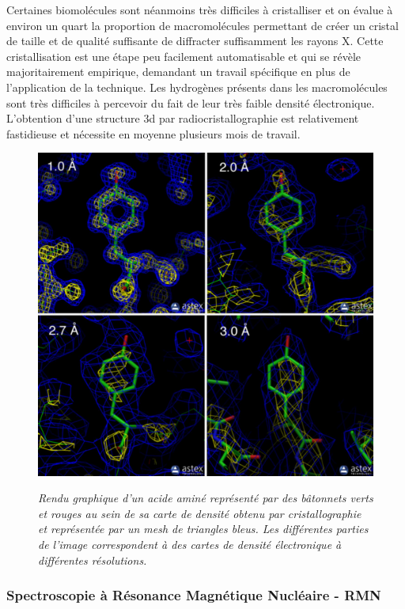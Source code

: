Certaines biomolécules sont néanmoins très difficiles à cristalliser et on évalue à environ un quart la proportion de macromolécules permettant de créer un cristal de taille et de qualité suffisante de diffracter suffisamment les rayons X. Cette cristallisation est une étape peu facilement automatisable et qui se révèle majoritairement empirique, demandant un travail spécifique en plus de l'application de la technique. Les hydrogènes présents dans les macromolécules sont très difficiles à percevoir du fait de leur très faible densité électronique. L'obtention d'une structure 3d par radiocristallographie est relativement fastidieuse et nécessite en moyenne plusieurs mois de travail.

\begin{figure}[h]
  \centering
  {\includegraphics[width=0.5\linewidth]{./figures/ch1/resolution_xray.pdf}}
    \caption{\it Rendu graphique d'un acide aminé représenté par des bâtonnets verts et rouges au sein de sa carte de densité obtenu par cristallographie et représentée par un mesh de triangles bleus. Les différentes parties de l'image correspondent à des cartes de densité électronique à différentes résolutions.}
    \label{Fig:resolution_xray}
  \hspace{0.2cm}
\end{figure}

\subsubsection{Spectroscopie à Résonance Magnétique Nucléaire - RMN}


